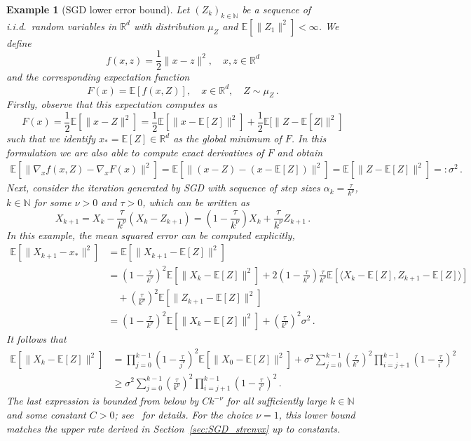 \documentclass[12pt,openany]{book}
\newtheorem{example}[thm]{Example}
\theoremstyle{definition}
\theoremstyle{definition}
\newcommand{\E}{\mathbb{E}}
\newcommand{\N}{\mathbb{N}}
\newcommand{\R}{\mathbb{R}}
\begin{document}
\begin{example}[SGD lower error bound]
Let $(Z_k)_{k\in\N}$ be a sequence of i.i.d.~random variables in $\R^d$ with distribution $\mu_Z$ and $\E[\|Z_1\|^2]<\infty$. We define
\[f(x,z) = \frac12\|x-z\|^2,\quad x,z\in\R^d \]
and the corresponding expectation function
\[F(x) = \E[f(x,Z)],\quad x\in\R^d,\quad Z\sim\mu_Z\,. \]
Firstly, observe that this expectation computes as
\[F(x) = \frac{1}{2}\E[\|x-Z\|^2] = \frac12\E[\|x-\E[Z]\|^2] + \frac12\E[\|Z-\E[Z|\|^2] \]
such that we identify $x_\ast = \E[Z]\in\R^d$ as the global minimum of $F$. In this formulation we are also able to compute exact derivatives of $F$ and obtain
\begin{align*}
\E[\|\nabla_x f(x,Z) - \nabla_x F(x)\|^2] = \E[\|(x-Z)-(x-\E[Z])\|^2] = \E[\|Z-\E[Z]\|^2]=:\sigma^2\,.
\end{align*}
Next, consider the iteration generated by SGD with sequence of step sizes $\alpha_k=\frac{\tau}{k^{\nu}}$, $k\in\N$ for some $\nu>0$ and $\tau>0$, which can be written as
\[X_{k+1} = X_k - \frac{\tau}{k^{\nu}}(X_k-Z_{k+1}) = (1-\frac{\tau}{k^{\nu}})X_k + \frac{\tau}{k^{\nu}} Z_{k+1}\,. \]
In this example, the mean squared error can be computed explicitly,
\begin{align*}
\E[\|X_{k+1}-x_\ast \|^2] &= \E[\|X_{k+1}-\E[Z]\|^2]\\ &= \left(1-\frac{\tau}{k^{\nu}}\right)^2\E[\|X_k-\E[Z]\|^2] + 2\left(1-\frac{\tau}{k^{\nu}}\right) \frac{\tau}{k^{\nu}}\E[\langle X_k-\E[Z],Z_{k+1}-\E[Z]\rangle] \\ &\quad+ \left(\frac{\tau}{k^{\nu}}\right)^2 \E[ \|Z_{k+1}-\E[Z]\|^2]\\
&= \left(1-\frac{\tau}{k^{\nu}}\right)^2\E[\|X_k-\E[Z]\|^2]+ \left(\frac{\tau}{k^{\nu}}\right)^2\sigma^2\,.
\end{align*}
It follows that
\begin{align*}
\E[\|X_k-\E[Z]\|^2] &= \prod_{j=0}^{k-1} \left(1-\frac{\tau}{j^{\nu}}\right)^2 \E[\|X_0-\E[Z]\|^2] + \sigma^2 \sum_{j=0}^{k-1}\left(\frac{\tau}{k^{\nu}}\right)^2 \prod_{i=j+1}^{k-1}\left(1-\frac{\tau}{i^\nu}\right)^2\\
&\ge \sigma^2 \sum_{j=0}^{k-1}\left(\frac{\tau}{k^{\nu}}\right)^2 \prod_{i=j+1}^{k-1}\left(1-\frac{\tau}{i^\nu}\right)^2\,.
\end{align*}
The last expression is bounded from below by $Ck^{-\nu}$ for all sufficiently large $k\in\N$ and some constant $C>0$; see~\cite{JENTZEN2020101438} for details. 
For the choice $\nu=1$, this lower bound matches the upper rate derived in Section~\ref{sec:SGD_strcnvx} up to
constants.
\end{example}
\end{document}

